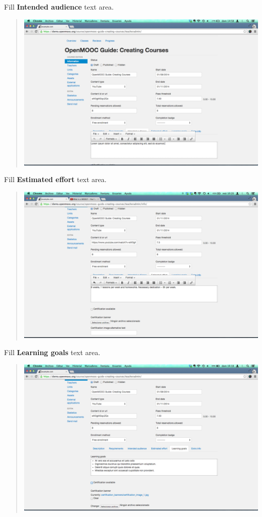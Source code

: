 \documentclass[letterpaper,10pt,english]{sphinxmanual}
\begin{document}
Fill \textbf{Intended audience} text area.
\begin{quote}

\includegraphics{2_course_information-8.png}
\end{quote}

Fill \textbf{Estimated effort} text area.
\begin{quote}

\includegraphics{2_course_information-9.png}
\end{quote}

Fill \textbf{Learning goals} text area.
\begin{quote}

\includegraphics{2_course_information-10.png}
\end{quote}
\end{document}
